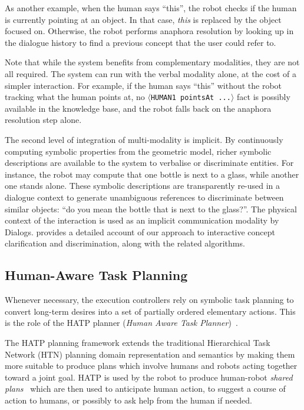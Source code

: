\documentclass[preprint,3p,times]{elsarticle}
\newcommand{\stmt}[1]{{\footnotesize\tt$\langle$#1\relax$\rangle$}}
\begin{document}
As another example, when the human says ``this'', the robot checks if the human
is currently pointing at an object. In that case, \emph{this} is replaced by the
object focused on. Otherwise, the robot performs anaphora resolution by looking
up in the dialogue history to find a previous concept that the user could refer
to.

Note that while the system benefits from complementary modalities, they are not
all required. The system can run with the verbal modality alone, at the cost of
a simpler interaction. For example, if the human says ``this'' without the robot
tracking what the human points at, no \stmt{HUMAN1 pointsAt ...} fact is
possibly available in the knowledge base, and the robot falls back on the
anaphora resolution step alone.

The second level of integration of multi-modality is implicit. By continuously
computing symbolic properties from the geometric model, richer symbolic
descriptions are available to the system to verbalise or discriminate entities.
For instance, the robot may compute that one bottle is next to a glass, while
another one stands alone. These symbolic descriptions are transparently
re-used in a dialogue context to generate unambiguous references to discriminate
between similar objects: ``do you mean the bottle that is next to the glass?''.
The physical context of the interaction is used as an implicit communication
modality by {\sc Dialogs}. \cite{Ros2010b} provides a detailed account of our
approach to interactive concept clarification and discrimination, along with the
related algorithms.


\subsection{Human-Aware Task Planning}
\label{hatp}

Whenever necessary, the execution controllers rely on symbolic task planning to convert long-term
desires into a set of partially ordered elementary actions. This is the role of the HATP
planner (\emph{Human Aware Task Planner})~\cite{Alili2008,
Alili2009,Lallement2014}.

The HATP planning framework extends the traditional Hierarchical Task
Network (HTN) planning domain representation and semantics by making them more
suitable to produce plans which involve humans and robots acting together
toward a joint goal. HATP is used by the robot to produce human-robot
\emph{shared plans}~\cite{Grosz1996,Clark1996,Kemp2007} which are then used to
anticipate human action, to suggest a course of action to humans, or possibly to ask
help from the human if needed.
\end{document}

